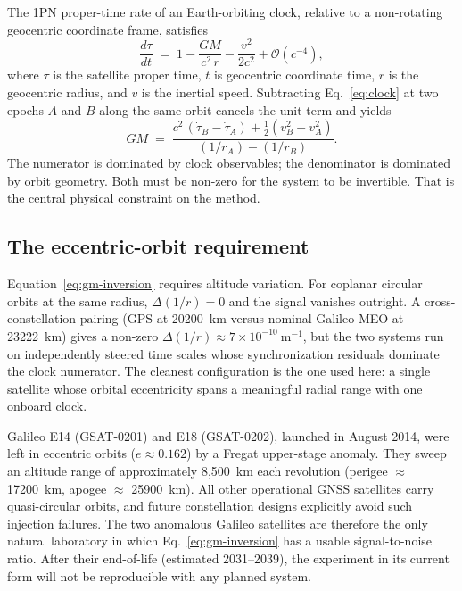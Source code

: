 \documentclass[11pt,a4paper]{article}
\begin{document}
The 1PN proper-time rate of an Earth-orbiting clock, relative to a non-rotating geocentric coordinate frame, satisfies
\begin{equation}
    \frac{d\tau}{dt} \;=\; 1 - \frac{GM}{c^2\,r} - \frac{v^2}{2c^2} + \mathcal{O}(c^{-4}),
    \label{eq:clock}
\end{equation}
where $\tau$ is the satellite proper time, $t$ is geocentric coordinate time, $r$ is the geocentric radius, and $v$ is the inertial speed. Subtracting Eq.~\eqref{eq:clock} at two epochs $A$ and $B$ along the same orbit cancels the unit term and yields
\begin{equation}
    GM \;=\; \frac{c^2\,(\dot\tau_B - \dot\tau_A) + \tfrac{1}{2}(v_B^2 - v_A^2)}{(1/r_A) - (1/r_B)}.
    \label{eq:gm-inversion}
\end{equation}
The numerator is dominated by clock observables; the denominator is dominated by orbit geometry. Both must be non-zero for the system to be invertible. That is the central physical constraint on the method.

\subsection{The eccentric-orbit requirement}
\label{sec:eccentric}

Equation~\eqref{eq:gm-inversion} requires altitude variation. For coplanar circular orbits at the same radius, $\Delta(1/r) = 0$ and the signal vanishes outright. A cross-constellation pairing (GPS at \SI{20200}{\km} versus nominal Galileo MEO at \SI{23222}{\km}) gives a non-zero $\Delta(1/r) \approx 7 \times 10^{-10}~\mathrm{m^{-1}}$, but the two systems run on independently steered time scales whose synchronization residuals dominate the clock numerator. The cleanest configuration is the one used here: a single satellite whose orbital eccentricity spans a meaningful radial range with one onboard clock.

Galileo E14 (GSAT-0201) and E18 (GSAT-0202), launched in August 2014, were left in eccentric orbits ($e \approx 0.162$) by a Fregat upper-stage anomaly. They sweep an altitude range of approximately 8,500~km each revolution (perigee $\approx$ \SI{17200}{\km}, apogee $\approx$ \SI{25900}{\km}). All other operational GNSS satellites carry quasi-circular orbits, and future constellation designs explicitly avoid such injection failures. The two anomalous Galileo satellites are therefore the only natural laboratory in which Eq.~\eqref{eq:gm-inversion} has a usable signal-to-noise ratio. After their end-of-life (estimated 2031--2039), the experiment in its current form will not be reproducible with any planned system.
\end{document}
